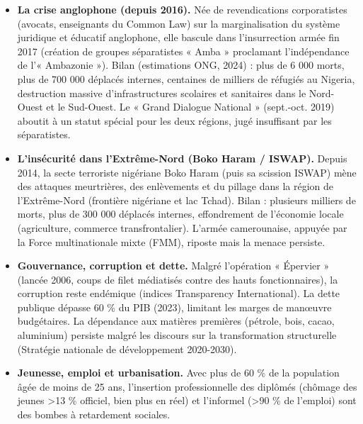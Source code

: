 \documentclass[11pt]{article}
\newcommand{\cle}[1]{{\popxbold\color{popdark}#1}}
\begin{document}
\begin{itemize}
\item \textbf{La crise anglophone (depuis 2016).} Née de revendications corporatistes (avocats, enseignants du Common Law) sur la marginalisation du système juridique et éducatif anglophone, elle bascule dans l'insurrection armée fin 2017 (création de groupes séparatistes « Amba » proclamant l'indépendance de l'« Ambazonie »). Bilan (estimations ONG, 2024) : plus de 6 000 morts, plus de 700 000 déplacés internes, centaines de milliers de réfugiés au Nigeria, destruction massive d'infrastructures scolaires et sanitaires dans le Nord-Ouest et le Sud-Ouest. Le « Grand Dialogue National » (sept.-oct. 2019) aboutit à un statut spécial pour les deux régions, jugé insuffisant par les séparatistes.
\item \textbf{L'insécurité dans l'Extrême-Nord (Boko Haram / ISWAP).} Depuis 2014, la secte terroriste nigériane Boko Haram (puis sa scission ISWAP) mène des attaques meurtrières, des enlèvements et du pillage dans la région de l'Extrême-Nord (frontière nigériane et lac Tchad). Bilan : plusieurs milliers de morts, plus de 300 000 déplacés internes, effondrement de l'économie locale (agriculture, commerce transfrontalier). L'armée camerounaise, appuyée par la Force multinationale mixte (FMM), riposte mais la menace persiste.
\item \textbf{Gouvernance, corruption et dette.} Malgré l'opération « \cle{Épervier} » (lancée 2006, coups de filet médiatisés contre des hauts fonctionnaires), la corruption reste endémique (indices Transparency International). La dette publique dépasse \num{60} \% du PIB (2023), limitant les marges de manœuvre budgétaires. La dépendance aux matières premières (pétrole, bois, cacao, aluminium) persiste malgré les discours sur la transformation structurelle (Stratégie nationale de développement 2020-2030).
\item \textbf{Jeunesse, emploi et urbanisation.} Avec plus de 60 \% de la population âgée de moins de 25 ans, l'insertion professionnelle des diplômés (chômage des jeunes \textgreater \num{13} \% officiel, bien plus en réel) et l'informel (\textgreater \num{90} \% de l'emploi) sont des bombes à retardement sociales.
\end{itemize}
\end{document}
